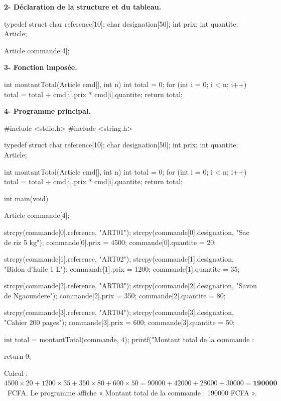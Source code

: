 \textbf{2- Déclaration de la structure et du tableau.}

\begin{codec}
typedef struct {
    char reference[10];
    char designation[50];
    int  prix;
    int  quantite;
} Article;

Article commande[4];
\end{codec}

\textbf{3- Fonction  imposée.}

\begin{codec}
int montantTotal(Article cmd[], int n) {
    int total = 0;
    for (int i = 0; i < n; i++) {
        total = total + cmd[i].prix * cmd[i].quantite;
    }
    return total;
}
\end{codec}

\textbf{4- Programme principal.}

\begin{codec}
#include <stdio.h>
#include <string.h>

typedef struct {
    char reference[10];
    char designation[50];
    int  prix;
    int  quantite;
} Article;

int montantTotal(Article cmd[], int n) {
    int total = 0;
    for (int i = 0; i < n; i++) {
        total = total + cmd[i].prix * cmd[i].quantite;
    }
    return total;
}

int main(void) {
    Article commande[4];

    strcpy(commande[0].reference, "ART01");
    strcpy(commande[0].designation, "Sac de riz 5 kg");
    commande[0].prix = 4500;  commande[0].quantite = 20;

    strcpy(commande[1].reference, "ART02");
    strcpy(commande[1].designation, "Bidon d'huile 1 L");
    commande[1].prix = 1200;  commande[1].quantite = 35;

    strcpy(commande[2].reference, "ART03");
    strcpy(commande[2].designation, "Savon de Ngaoundere");
    commande[2].prix = 350;   commande[2].quantite = 80;

    strcpy(commande[3].reference, "ART04");
    strcpy(commande[3].designation, "Cahier 200 pages");
    commande[3].prix = 600;   commande[3].quantite = 50;

    int total = montantTotal(commande, 4);
    printf("Montant total de la commande : %

    return 0;
}
\end{codec}

Calcul : $4500\times20 + 1200\times35 + 350\times80 + 600\times50
= 90000 + 42000 + 28000 + 30000 = \mathbf{190000}$~FCFA. Le programme affiche
« Montant total de la commande : 190000 FCFA ».

